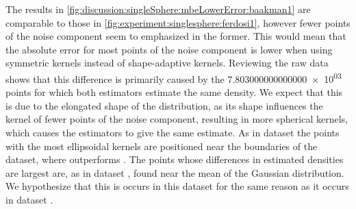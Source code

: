 


		The results in \cref{fig:discussion:singleSphere:mbeLowerError:baakman1} are comparable to those in \cref{fig:experiment:singlesphere:ferdosi1}, however fewer points of the noise component seem to emphasized in the former. This would mean that the absolute error for most points of the noise component is lower when using symmetric kernels instead of shape-adaptive kernels. Reviewing the raw data shows that this difference is primarily caused by the \num{7.803000000000000e+03} points for which both estimators estimate the same density. We expect that this is due to the elongated shape of the distribution, as its shape influences the kernel of fewer points of the noise component, resulting in more spherical kernels, which causes the estimators to give the same estimate.
		As in dataset \ferdosiOne the points with the most ellipsoidal kernels are positioned near the boundaries of the dataset, where \sambe outperforms \mbe. 
		The points whose differences in estimated densities are largest are, as in dataset \ferdosiOne, found near the mean of the Gaussian distribution. We hypothesize that this is occurs in this dataset for the same reason as it occurs in dataset \ferdosiOne.


